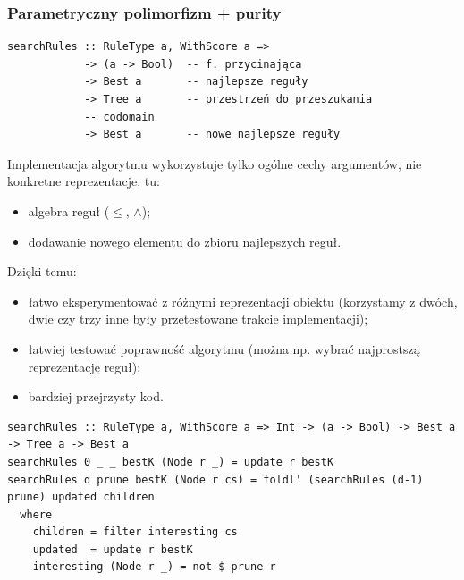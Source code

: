 \documentclass[8pt]{beamer}
\begin{document}
\begin{frame}
  \frametitle{Parametryczny polimorfizm + purity}
\begin{verbatim}
searchRules :: RuleType a, WithScore a =>
            -> (a -> Bool)  -- f. przycinająca
            -> Best a       -- najlepsze reguły
            -> Tree a       -- przestrzeń do przeszukania
            -- codomain
            -> Best a       -- nowe najlepsze reguły
\end{verbatim}

  Implementacja algorytmu wykorzystuje tylko ogólne cechy argumentów,
  nie konkretne reprezentacje, tu:
  \begin{itemize}
  \item algebra reguł ($\le$, $\wedge$);
  \item dodawanie nowego elementu do zbioru najlepszych reguł.
  \end{itemize}

  \pause

  Dzięki temu:
  \begin{itemize}
  \item łatwo eksperymentować z różnymi reprezentacji obiektu (korzystamy z
    dwóch, dwie czy trzy inne były przetestowane trakcie implementacji);
  \item łatwiej testować poprawność algorytmu (można np. wybrać najprostszą
    reprezentację reguł);
  \item bardziej przejrzysty kod.
  \end{itemize}

  \pause

\begin{verbatim}
searchRules :: RuleType a, WithScore a => Int -> (a -> Bool) -> Best a -> Tree a -> Best a
searchRules 0 _ _ bestK (Node r _) = update r bestK
searchRules d prune bestK (Node r cs) = foldl' (searchRules (d-1) prune) updated children
  where
    children = filter interesting cs
    updated  = update r bestK
    interesting (Node r _) = not $ prune r
\end{verbatim}

\end{frame}
\end{document}
